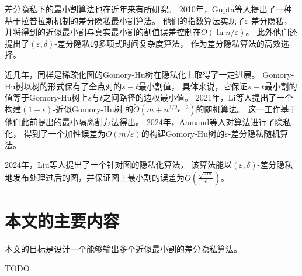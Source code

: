 差分隐私下的最小割算法也在近年来有所研究。
2010年，Gupta等人提出了一种基于拉普拉斯机制的差分隐私最小割算法。\cite{gupta2010differentially}
他们的指数算法实现了$\varepsilon$-差分隐私，
并将得到的近似最小割与真实最小割的割值误差控制在$O(\ln n/\varepsilon)$。
此外他们还提出了$(\varepsilon,\delta)$-差分隐私的多项式时间复杂度算法，
作为差分隐私算法的高效选择。

近几年，同样是稀疏化图的Gomory-Hu树在隐私化上取得了一定进展。
Gomory-Hu树以树的形式保有了全点对的$s-t$最小割值，
具体来说，它保证$s-t$最小割的值等于Gomory-Hu树上$s$与$t$之间路径的边权最小值。
2021年，Li等人提出了一个构建$(1+\epsilon)$-近似Gomory-Hu树
的$\tilde O(m+n^{3/2}\epsilon^{-2})$的随机算法。\cite{li2021approximate}
这一工作基于他们此前提出的最小隔离割方法得出。\cite{li2020deterministic}
2024年，Aamand等人对算法进行了隐私化，
得到了一个加性误差为$\tilde O(m/\varepsilon)$的构建Gomory-Hu树的$\varepsilon$-差分隐私随机算法。\cite{li2021approximate}

2024年，Liu等人提出了一个针对图的隐私化算法，
该算法能以$(\varepsilon,\delta)$-差分隐私地发布处理过后的图，并保证图上最小割的误差为$\tilde O(\frac{\sqrt {nm}}{\epsilon})$。\cite{liu2024almost}

\section{本文的主要内容}

本文的目标是设计一个能够输出多个近似最小割的差分隐私算法。

TODO